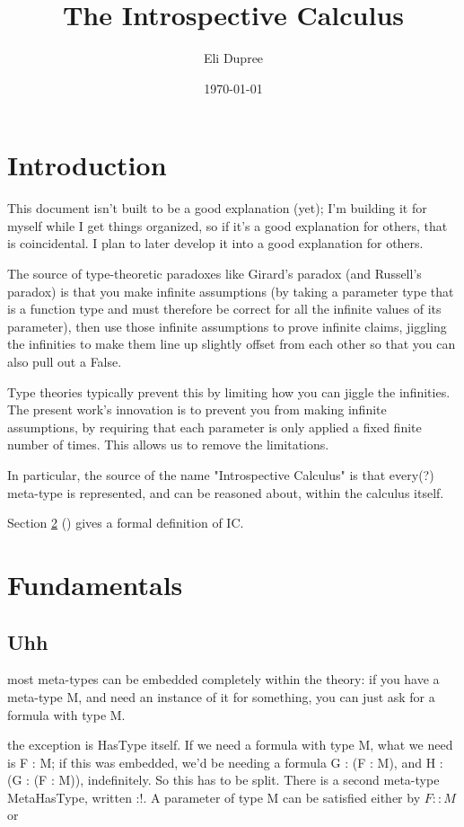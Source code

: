 \documentclass{article}
\title{The Introspective Calculus}
\author{Eli Dupree}
\date{\today}
\newcommand{\hastypemeta}[2]{#1 :: #2}
\begin{document}
  \maketitle
  
  \section{Introduction}
  
  This document isn't built to be a good explanation (yet); I'm building it for myself while I get things organized, so if it's a good explanation for others, that is coincidental. I plan to later develop it into a good explanation for others.
  
  The source of type-theoretic paradoxes like Girard's paradox (and Russell's paradox) is that you make infinite assumptions (by taking a parameter type that is a function type and must therefore be correct for all the infinite values of its parameter), then use those infinite assumptions to prove infinite claims, jiggling the infinities to make them line up slightly offset from each other so that you can also pull out a False.
  
  Type theories typically prevent this by limiting how you can jiggle the infinities. The present work's innovation is to prevent you from making infinite assumptions, by requiring that each parameter is only applied a fixed finite number of times. This allows us to remove the limitations.
  
  In particular, the source of the name "Introspective Calculus" is that every(?) meta-type is represented, and can be reasoned about, within the calculus itself.
  
  Section \ref{fundamentals} (\textit{}) gives a formal definition of IC.  

  \section{Fundamentals}\label{fundamentals}
  \subsection{Uhh}
  
  most meta-types can be embedded completely within the theory: if you have a meta-type M, and need an instance of it for something, you can just ask for a formula with type M.
  
  the exception is HasType itself. If we need a formula with type M, what we need is F : M; if this was embedded, we'd be needing a formula G : (F : M), and H : (G : (F : M)), indefinitely. So this has to be split. There is a second meta-type MetaHasType, written :!. A parameter of type M can be satisfied either by $\hastypemeta{F}{M}$ or
  
\end{document}

